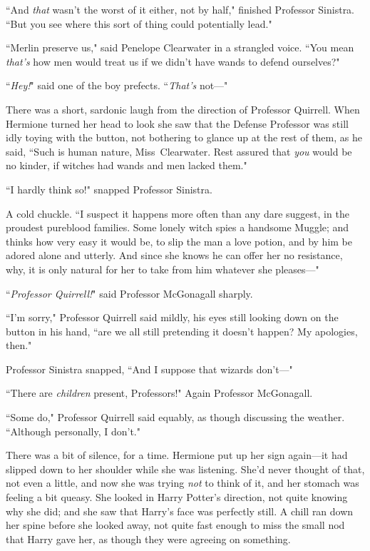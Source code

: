 ``And \emph{that} wasn't the worst of it either, not by half," finished Professor Sinistra. ``But you see where this sort of thing could potentially lead."

``Merlin preserve us," said Penelope Clearwater in a strangled voice. ``You mean \emph{that's} how men would treat us if we didn't have wands to defend ourselves?"

``\emph{Hey!}" said one of the boy prefects. ``\emph{That's} not---"

There was a short, sardonic laugh from the direction of Professor Quirrell. When Hermione turned her head to look she saw that the Defense Professor was still idly toying with the button, not bothering to glance up at the rest of them, as he said, ``Such is human nature, Miss~Clearwater. Rest assured that \emph{you} would be no kinder, if witches had wands and men lacked them."

``I hardly think so!" snapped Professor Sinistra.

A cold chuckle. ``I suspect it happens more often than any dare suggest, in the proudest pureblood families. Some lonely witch spies a handsome Muggle; and thinks how very easy it would be, to slip the man a love potion, and by him be adored alone and utterly. And since she knows he can offer her no resistance, why, it is only natural for her to take from him whatever she pleases---"

``\emph{Professor Quirrell!}" said Professor McGonagall sharply.

``I'm sorry," Professor Quirrell said mildly, his eyes still looking down on the button in his hand, ``are we all still pretending it doesn't happen? My apologies, then."

Professor Sinistra snapped, ``And I suppose that wizards don't---"

``There are \emph{children} present, Professors!" Again Professor McGonagall.

``Some do," Professor Quirrell said equably, as though discussing the weather. ``Although personally, I don't."

There was a bit of silence, for a time. Hermione put up her sign again---it had slipped down to her shoulder while she was listening. She'd never thought of that, not even a little, and now she was trying \emph{not} to think of it, and her stomach was feeling a bit queasy. She looked in Harry Potter's direction, not quite knowing why she did; and she saw that Harry's face was perfectly still. A chill ran down her spine before she looked away, not quite fast enough to miss the small nod that Harry gave her, as though they were agreeing on something.

